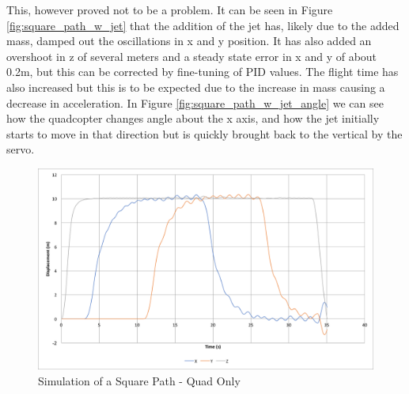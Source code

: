 \documentclass[11pt]{article}
\begin{document}
This, however proved not to be a problem. It can be seen in Figure \ref{fig:square_path_w_jet} that the addition of the jet has, likely due to the added mass, damped out the oscillations in x and y position. It has also added an overshoot in z of several meters and a steady state error in x and y of about 0.2m, but this can be corrected by fine-tuning of PID values. The flight time has also increased but this is to be expected due to the increase in mass causing a decrease in acceleration. In Figure \ref{fig:square_path_w_jet_angle} we can see how the quadcopter changes angle about the x axis, and how the jet initially starts to move in that direction but is quickly brought back to the vertical by the servo.

\begin{figure}
    \vspace{20em}
    \includegraphics[width=\linewidth]{square_path_quad_only}
    \caption{Simulation of a Square Path - Quad Only}
    \label{fig:square_path_quad_only}
\end{figure}
\end{document}
